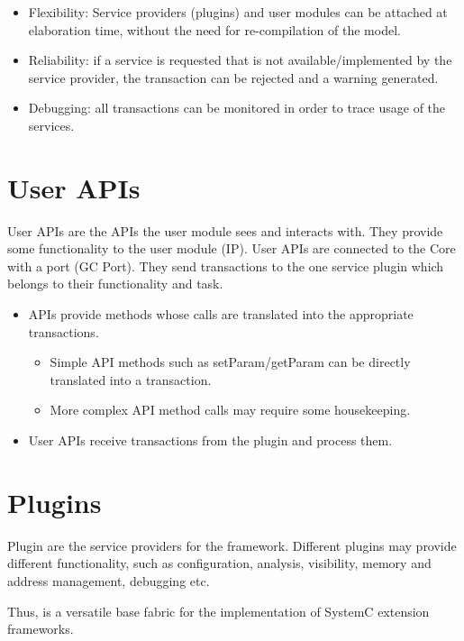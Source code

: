 \begin{itemize}
	\item Flexibility: Service providers (plugins) and user modules can be attached at elaboration time, without the need for re-compilation of the model. 
	\item Reliability: if a service is requested that is not available/implemented by the service provider, the transaction can be rejected and a warning generated.
	\item Debugging: all transactions can be monitored in order to trace usage of the \GreenControl services.
\end{itemize}



\section{User APIs}
User APIs are the APIs the user module sees and interacts with. They provide some functionality to the user module (IP). User APIs are connected to the \GreenControl Core with a port (GC Port). They send transactions to the one service plugin which belongs to their functionality and task.

\begin{itemize}
	\item APIs provide methods whose calls are translated into the appropriate \GreenControl transactions. 
	\begin{itemize}
		\item Simple API methods such as setParam/getParam can be directly translated into a transaction.
		\item More complex API method calls may require some housekeeping.
	\end{itemize}

	\item User APIs receive transactions from the plugin and process them.
\end{itemize}


\section{Plugins}
Plugin are the service providers for the \GreenControl framework. Different plugins may provide different functionality, such as configuration, analysis, visibility, memory and address management, debugging etc.

Thus, \GreenControl is a versatile base fabric for the implementation of SystemC extension frameworks.

